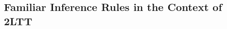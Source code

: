 \documentclass{article}
\begin{document}
\subsection{Familiar Inference Rules in the Context of 2LTT}




% 






% 


% 

\end{document}
